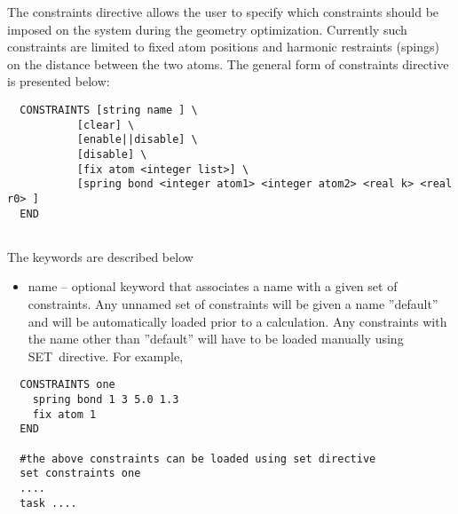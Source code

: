 \label{sec:constraints}

The constraints directive  allows the user to specify which constraints
should be imposed on the system during the geometry optimization. Currently
such constraints are limited to fixed atom positions and 
harmonic restraints (spings) on the distance between the two atoms. The
general form of constraints directive is presented below: 
\begin{verbatim}
  CONSTRAINTS [string name ] \
           [clear] \
           [enable||disable] \
           [disable] \
           [fix atom <integer list>] \
           [spring bond <integer atom1> <integer atom2> <real k> <real r0> ]
  END
          
\end{verbatim}
The keywords are described below 
\begin{itemize}
\item name -- optional keyword that associates a name with a given set of
constraints. Any unnamed set of constraints will be given a name ''default''
and will be automatically loaded prior to a calculation. Any constraints
with the name other than ''default''  will have to be loaded manually using
SET\ directive. For example,
\end{itemize}

\begin{verbatim}
  CONSTRAINTS one
    spring bond 1 3 5.0 1.3
    fix atom 1
  END
   
  #the above constraints can be loaded using set directive
  set constraints one
  ....
  task ....
\end{verbatim}

